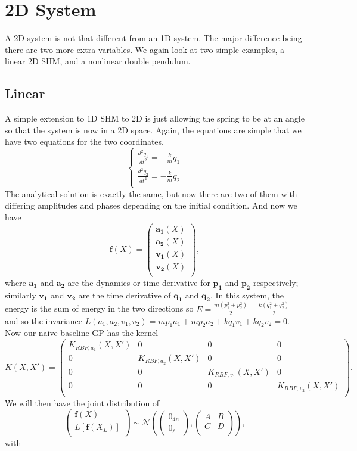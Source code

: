\documentclass{statsmsc}
\begin{document}
\section{2D System}
A 2D system is not that different from an 1D system. The major difference being there are two more extra variables. 
We again look at two simple examples, a linear 2D SHM, and a nonlinear double pendulum.
\subsection{Linear}
A simple extension to 1D SHM to 2D is just allowing the spring to be at an angle so that the system is now in a 2D space.
Again, the equations are simple that we have two equations for the two coordinates.
$$
\begin{cases}
    \frac{d^2{q_1}}{dt^2} = -\frac{k}{m}q_1\\
    \frac{d^2{q_2}}{dt^2} = -\frac{k}{m}q_2\\
\end{cases}
$$
The analytical solution is exactly the same, but now there are two of them with differing amplitudes and phases depending on the initial condition. 
And now we have $$\mathbf{f}(X)=\begin{pmatrix}
    \mathbf{a_1}(X)\\
    \mathbf{a_2}(X)\\
    \mathbf{v_1}(X)\\
    \mathbf{v_2}(X)\\
\end{pmatrix},$$
where $\mathbf{a_1}$ and $\mathbf{a_2}$ are the dynamics or time derivative for $\mathbf{p_1}$ and $\mathbf{p_2}$ respectively; similarly $\mathbf{v_1}$ and $\mathbf{v_2}$ are the time derivative of $\mathbf{q_1}$ and $\mathbf{q_2}$.
In this system, the energy is the sum of energy in the two directions so $E=\frac{m(p_1^2+p_2^2)}{2}+\frac{k(q_1^2+q_2^2)}{2}$ and so the invariance $L(a_1, a_2, v_1, v_2)=mp_1a_1+mp_2a_2+kq_1v_1+kq_2v_2=0.$
Now our naive baseline GP has the kernel
$$
K(X,X')=\begin{pmatrix}
K_{RBF,a_1}(X,X') & 0 & 0 & 0 \\
0 & K_{RBF,a_2}(X,X') & 0 & 0 \\
0 & 0 & K_{RBF,v_1}(X,X') & 0 \\
0 & 0 & 0 & K_{RBF,v_2}(X,X') \\
\end{pmatrix}.
$$
We will then have the joint distribution of
$$
\begin{pmatrix}
    \mathbf{f}(X)\\L[\mathbf{f}(X_L)]\\
\end{pmatrix}
\sim\mathcal{N}
\left(
\begin{pmatrix}
    0_{4n} \\ 0_{\ell}
\end{pmatrix},
\begin{pmatrix}
    A & B \\
    C & D\\
\end{pmatrix}
\right),
$$
with 
\end{document}
